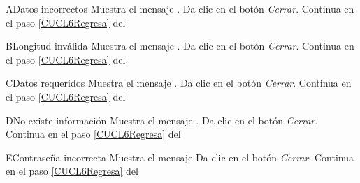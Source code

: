 
\begin{UCtrayectoriaA}{A}{Datos incorrectos}
	\UCpaso Muestra el mensaje . 
	\UCpaso[\UCactor] Da clic en el botón \textit{Cerrar}.
	\UCpaso[\UCactor] Continua en el paso \ref{CUCL6Regresa} del 

\end{UCtrayectoriaA} 

\begin{UCtrayectoriaA}{B}{Longitud inválida}
	\UCpaso Muestra el mensaje . 
	\UCpaso[\UCactor] Da clic en el botón \textit{Cerrar}.
	\UCpaso[\UCactor] Continua en el paso \ref{CUCL6Regresa} del 

\end{UCtrayectoriaA}

\begin{UCtrayectoriaA}{C}{Datos requeridos}
	\UCpaso Muestra el mensaje . 
	\UCpaso[\UCactor] Da clic en el botón \textit{Cerrar}.
	\UCpaso[\UCactor] Continua en el paso \ref{CUCL6Regresa} del 

\end{UCtrayectoriaA}

\begin{UCtrayectoriaA}{D}{No existe información}
	\UCpaso Muestra el mensaje . 
	\UCpaso[\UCactor] Da clic en el botón \textit{Cerrar}.
	\UCpaso[\UCactor] Continua en el paso \ref{CUCL6Regresa} del 

\end{UCtrayectoriaA}


\begin{UCtrayectoriaA}{E}{Contraseña incorrecta}
	\UCpaso Muestra el mensaje  
	\UCpaso[\UCactor] Da clic en el botón \textit{Cerrar}.
	\UCpaso[\UCactor] Continua en el paso \ref{CUCL6Regresa} del 

\end{UCtrayectoriaA} 

		
